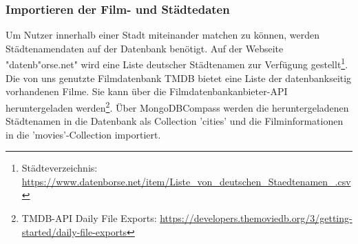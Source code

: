 \subsubsection{Importieren der Film- und Städtedaten}
Um Nutzer innerhalb einer Stadt miteinander matchen zu können, werden Städtenamendaten auf der Datenbank benötigt. Auf der Webseite "datenb"orse.net" wird eine Liste deutscher Städtenamen zur Verfügung gestellt\footnote{Städteverzeichnis: \url{https://www.datenborse.net/item/Liste\_von\_deutschen\_Staedtenamen\_.csv}}.
Die von uns genutzte Filmdatenbank TMDB bietet eine Liste der datenbankseitig vorhandenen Filme. Sie kann über die Filmdatenbankanbieter-API heruntergeladen werden\footnote{TMDB-API Daily File Exports: \url{https://developers.themoviedb.org/3/getting-started/daily-file-exports}}. 
Über MongoDBCompass werden die heruntergeladenen Städtenamen in die Datenbank als Collection 'cities' und die Filminformationen in die 'movies'-Collection importiert.

